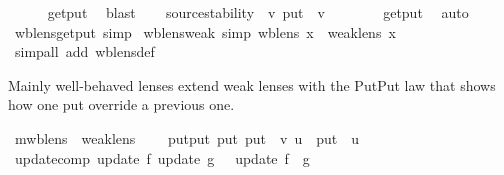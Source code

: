 \begin{isabellebody}
%
\isadelimproof
\ \ \ \ %
\endisadelimproof
%
\isatagproof
{}\isamarkupfalse%
\ get{\isacharunderscore}put\ \isamarkupfalse%
\ blast%
\endisatagproof
{\isafoldproof}%
%
\isadelimproof
\isanewline
%
\endisadelimproof
\isanewline
\ \ \isamarkupfalse%
\ source{\isacharunderscore}stability{\isacharcolon}\ {\isachardoublequoteopen}{\isasymexists}\ v{\isachardot}\ put\ {\isasymsigma}\ v\ {\isacharequal}\ {\isasymsigma}{\isachardoublequoteclose}\isanewline
%
\isadelimproof
\ \ \ \ %
\endisadelimproof
%
\isatagproof
{}\isamarkupfalse%
\ get{\isacharunderscore}put\ \isamarkupfalse%
\ auto%
\endisatagproof
{\isafoldproof}%
%
\isadelimproof
\isanewline
%
\endisadelimproof
\isanewline
{}\isamarkupfalse%
\isanewline
\isanewline
{}\isamarkupfalse%
\ wb{\isacharunderscore}lens{\isachardot}get{\isacharunderscore}put\ {\isacharbrackleft}simp{\isacharbrackright}\isanewline
\isanewline
{}\isamarkupfalse%
\ wb{\isacharunderscore}lens{\isacharunderscore}weak\ {\isacharbrackleft}simp{\isacharbrackright}{\isacharcolon}\ {\isachardoublequoteopen}wb{\isacharunderscore}lens\ x\ {\isasymLongrightarrow}\ weak{\isacharunderscore}lens\ x{\isachardoublequoteclose}\isanewline
%
\isadelimproof
\ \ %
\endisadelimproof
%
\isatagproof
{}\isamarkupfalse%
\ {\isacharparenleft}simp{\isacharunderscore}all\ add{\isacharcolon}\ wb{\isacharunderscore}lens{\isacharunderscore}def{\isacharparenright}%
\endisatagproof
{\isafoldproof}%
%
\isadelimproof
%
\endisadelimproof
%
\isamarkuptrue%
%
\begin{isamarkuptext}%
Mainly well-behaved lenses extend weak lenses with the PutPut law that shows how one put
  override a previous one.%
\end{isamarkuptext}\isamarkuptrue%
\isamarkupfalse%
\ mwb{\isacharunderscore}lens\ {\isacharequal}\ weak{\isacharunderscore}lens\ {\isacharplus}\isanewline
\ \ \ put{\isacharunderscore}put{\isacharcolon}\ {\isachardoublequoteopen}put\ {\isacharparenleft}put\ {\isasymsigma}\ v{\isacharparenright}\ u\ {\isacharequal}\ put\ {\isasymsigma}\ u{\isachardoublequoteclose}\isanewline
{}\isanewline
\isanewline
\ \ \isamarkupfalse%
\ update{\isacharunderscore}comp{\isacharcolon}\ {\isachardoublequoteopen}update\ f\ {\isacharparenleft}update\ g\ {\isasymsigma}{\isacharparenright}\ {\isacharequal}\ update\ {\isacharparenleft}f\ {\isasymcirc}\ g{\isacharparenright}\ {\isasymsigma}{\isachardoublequoteclose}\isanewline

\end{isabellebody}
